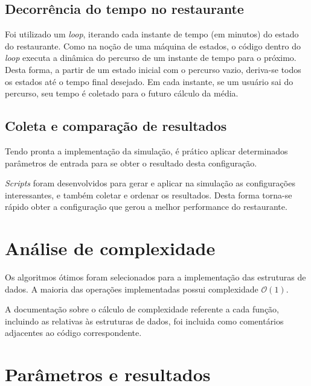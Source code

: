 \documentclass{article}
\begin{document}
\subsection{Decorrência do tempo no restaurante}
Foi utilizado um \textit{loop}, iterando cada instante de tempo (em minutos) do estado do restaurante. Como na noção de uma máquina de estados, o código dentro do \textit{loop} executa a dinâmica do percurso de um instante de tempo para o próximo. Desta forma, a partir de um estado inicial com o percurso vazio, deriva-se todos os estados até o tempo final desejado. Em cada instante, se um usuário sai do percurso, seu tempo é coletado para o futuro cálculo da média.

\subsection{Coleta e comparação de resultados}
Tendo pronta a implementação da simulação, é prático aplicar determinados parâmetros de entrada para se obter o resultado desta configuração.

\textit{Scripts} foram desenvolvidos para gerar e aplicar na simulação as configurações interessantes, e também coletar e ordenar os resultados. Desta forma torna-se rápido obter a configuração que gerou a melhor performance do restaurante.


\section{Análise de complexidade}
Os algoritmos ótimos foram selecionados para a implementação das estruturas de dados. A maioria das operações implementadas possui complexidade $\mathcal{O}(1)$.

A documentação sobre o cálculo de complexidade referente a cada função, incluindo as relativas às estruturas de dados, foi incluida como comentários adjacentes ao código correspondente.


\section{Parâmetros e resultados}
\end{document}
